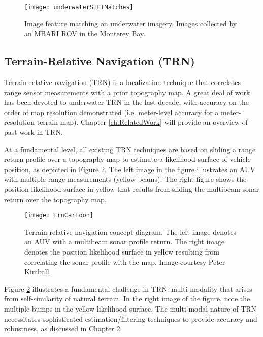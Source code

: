 \begin{figure}[!h]
	\centering
		\texttt{[image: underwaterSIFTMatches]}
	\caption{Image feature matching on underwater imagery.  Images collected by an MBARI ROV in the Monterey Bay.}
	\label{fig:siftMatches}
\end{figure}



\subsection{Terrain-Relative Navigation (TRN)}
\label{intro.Existing.Terrain}

Terrain-relative navigation (TRN) is a localization technique that correlates range sensor measurements with a prior topography map.  A great deal of work has been devoted to underwater TRN in the last decade, with accuracy on the order of map resolution demonstrated (i.e. meter-level accuracy for a meter-resolution terrain map).  Chapter \ref{ch.RelatedWork} will provide an overview of past work in TRN.

At a fundamental level, all existing TRN techniques are based on sliding a range return profile over a topography map to estimate a likelihood surface of vehicle position, as depicted in Figure \ref{fig:trnCartoon}.  The left image in the figure illustrates an AUV with multiple range measurements (yellow beams).  The right figure shows the position likelihood surface in yellow that results from sliding the multibeam sonar return over the topography map.  

\begin{figure}[!h]
	\centering
		\texttt{[image: trnCartoon]}
	\caption{Terrain-relative navigation concept diagram.  The left image denotes an AUV with a multibeam sonar profile return.  The right image denotes the position likelihood surface in yellow resulting from correlating the sonar profile with the map.  Image courtesy Peter Kimball.}
	\label{fig:trnCartoon}
\end{figure}

Figure \ref{fig:trnCartoon} illustrates a fundamental challenge in TRN: multi-modality that arises from self-similarity of natural terrain.  In the right image of the figure, note the multiple bumps in the yellow likelihood surface.  The multi-modal nature of TRN necessitates sophisticated estimation/filtering techniques to provide accuracy and robustness, as discussed in Chapter 2.

